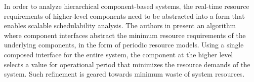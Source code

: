 In order to analyze hierarchical component-based systems, the real-time resource requirements of higher-level components need to be abstracted into a form that enables scalable schedulability analysis. The authors in \cite{easwaran2006} present an algorithm where component interfaces abstract the minimum resource requirements of the underlying components, in the form of periodic resource models. Using a single composed interface for the entire system, the component at the higher level selects a value for operational period that minimizes the resource demands of the system. Such refinement is geared towards minimum waste of system resources.






